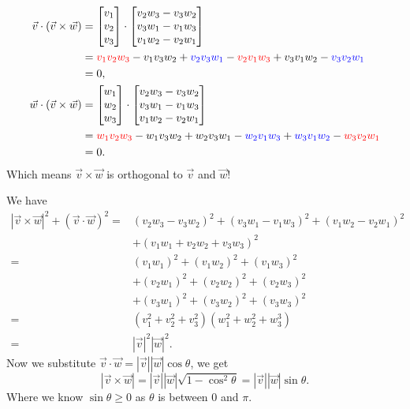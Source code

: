 \begin{align*}
	\vec{v} \cdot (\vec{v}\times\vec{w}) &= \begin{bmatrix}
		v_1 \\v_2\\v_3
	\end{bmatrix}\cdot\begin{bmatrix}
	v_2w_3-v_3w_2\\
	v_3w_1 - v_1w_3\\
	v_1w_2 - v_2w_1\\
	\end{bmatrix} \\
	&= \color{red}v_1v_2w_3\color{black}-\color{black}v_1v_3w_2\color{black}+\color{blue}v_2v_3w_1\color{black}-\color{red}v_2v_1w_3\color{black}+\color{black}v_3v_1w_2\color{black}-\color{blue}v_3v_2w_1\\
	&=0,\\
	\vec{w} \cdot (\vec{v}\times\vec{w}) &= \begin{bmatrix}
		w_1 \\w_2\\w_3
	\end{bmatrix}\cdot\begin{bmatrix}
		v_2w_3-v_3w_2\\
		v_3w_1 - v_1w_3\\
		v_1w_2 - v_2w_1\\
	\end{bmatrix} \\
	&= \color{red}w_1v_2w_3\color{black}-\color{black}w_1v_3w_2\color{black}+\color{black}w_2v_3w_1\color{black}-\color{blue}w_2v_1w_3\color{black}+\color{blue}w_3v_1w_2\color{black}-\color{red}w_3v_2w_1\\
	&=0.\\
\end{align*}
Which means $\vec{v}\times\vec{w}$ is orthogonal to $\vec{v}$ and $\vec{w}$!

We have
\begin{align*}
|\vec{v}\times\vec{w}|^2 + (\vec{v}\cdot\vec{w})^2 =&
(v_2w_3-v_3w_2)^2 +(v_3w_1 - v_1w_3)^2 + (v_1w_2 - v_2w_1)^2 
\\ &+ 
(v_1w_1 + v_2w_2 + v_3w_3)^2\\
=& (v_1w_1)^2+(v_1w_2)^2+(v_1w_3)^2\\&+(v_2w_1)^2+(v_2w_2)^2+(v_2w_3)^2\\&+(v_3w_1)^2+(v_3w_2)^2+(v_3w_3)^2\\
=&(v_1^2 + v_2^2+v_3^2)(w_1^2+w_2^2+w_3^3)\\
=&|\vec{v}|^2|\vec{w}|^2.
\end{align*}
Now we substitute $\vec{v}\cdot\vec{w}=|\vec{v}||\vec{w}|\cos\theta$, we get \[
	|\vec{v}\times\vec{w}|=|\vec{v}||\vec{w}|\sqrt{1-\cos^2\theta} = |\vec{v}||\vec{w}|\sin\theta.
\]
Where we know $\sin \theta \geq 0$ as $\theta$ is between $0$ and $\pi$.

